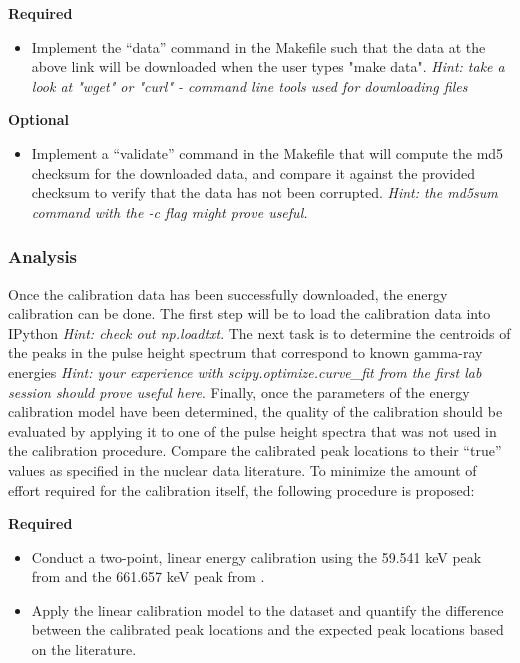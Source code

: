 \documentclass[11pt]{article}
\begin{document}
{\bf Required}
\begin{itemize}
  \item Implement the ``data'' command in the Makefile such that the data at the 
        above link will be downloaded when the user types "make data". 
        \textit{Hint: take a look at "wget" or "curl" - command line tools 
                used for downloading files}
\end{itemize}

{\bf Optional}
\begin{itemize}
  \item Implement a ``validate'' command in the Makefile that will compute the
        md5 checksum for the downloaded data, and compare it against the 
        provided checksum to verify that the data has not been corrupted.
        \textit{Hint: the md5sum command with the -c flag might prove useful.}
\end{itemize}

\subsubsection*{Analysis}

Once the calibration data has been successfully downloaded, the energy 
calibration can be done.
The first step will be to load the calibration data into IPython 
\textit{Hint: check out np.loadtxt}.
The next task is to determine the centroids of the peaks in the pulse height
spectrum that correspond to known gamma-ray energies
\textit{Hint: your experience with scipy.optimize.curve\_fit from the first
        lab session should prove useful here}.
Finally, once the parameters of the energy calibration model have been 
determined, the quality of the calibration should be evaluated by applying it
to one of the pulse height spectra that was not used in the calibration 
procedure.
Compare the calibrated peak locations to their ``true'' values as specified in
the nuclear data literature.
To minimize the amount of effort required for the calibration itself, the
following procedure is proposed:

{\bf Required}
\begin{itemize}
  \item Conduct a two-point, linear energy calibration using the 59.541 keV
        peak from  and the 661.657 keV peak from .
  \item Apply the linear calibration model to the  dataset and 
        quantify the difference between the calibrated peak locations and the 
        expected peak locations based on the literature.
\end{itemize}
\end{document}
